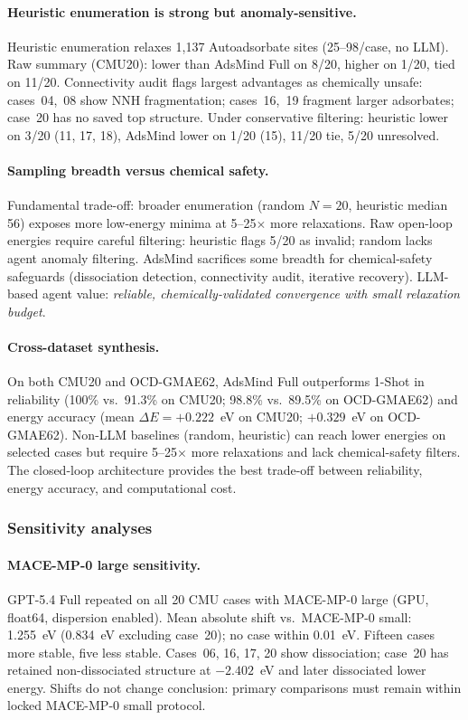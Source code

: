 \paragraph{Heuristic enumeration is strong but anomaly-sensitive.}
Heuristic enumeration relaxes 1{,}137 Autoadsorbate sites (25--98/case, no LLM).
Raw summary (CMU20): lower than AdsMind Full on 8/20, higher on 1/20, tied on 11/20.
Connectivity audit flags largest advantages as chemically unsafe: cases~04,~08 show NNH fragmentation; cases~16,~19 fragment larger adsorbates; case~20 has no saved top structure.
Under conservative filtering: heuristic lower on 3/20 (11, 17, 18), AdsMind lower on 1/20 (15), 11/20 tie, 5/20 unresolved.

\paragraph{Sampling breadth versus chemical safety.}
Fundamental trade-off: broader enumeration (random $N=20$, heuristic median 56) exposes more low-energy minima at 5--25$\times$ more relaxations.
Raw open-loop energies require careful filtering: heuristic flags 5/20 as invalid; random lacks agent anomaly filtering.
AdsMind sacrifices some breadth for chemical-safety safeguards (dissociation detection, connectivity audit, iterative recovery).
LLM-based agent value: \textit{reliable, chemically-validated convergence with small relaxation budget}.

\paragraph{Cross-dataset synthesis.}
On both CMU20 and OCD-GMAE62, AdsMind Full outperforms 1-Shot in reliability (100\% vs.\ 91.3\% on CMU20; 98.8\% vs.\ 89.5\% on OCD-GMAE62) and energy accuracy (mean $\Delta E = +0.222$~eV on CMU20; $+0.329$~eV on OCD-GMAE62).
Non-LLM baselines (random, heuristic) can reach lower energies on selected cases but require 5--25$\times$ more relaxations and lack chemical-safety filters.
The closed-loop architecture provides the best trade-off between reliability, energy accuracy, and computational cost.

\subsubsection{Sensitivity analyses}

\paragraph{MACE-MP-0 large sensitivity.}
GPT-5.4 Full repeated on all 20 CMU cases with MACE-MP-0 large (GPU, float64, dispersion enabled).
Mean absolute shift vs.\ MACE-MP-0 small: 1.255~eV (0.834~eV excluding case~20); no case within 0.01~eV.
Fifteen cases more stable, five less stable.
Cases~06, 16, 17, 20 show dissociation; case~20 has retained non-dissociated structure at $-2.402$~eV and later dissociated lower energy.
Shifts do not change conclusion: primary comparisons must remain within locked MACE-MP-0 small protocol.

